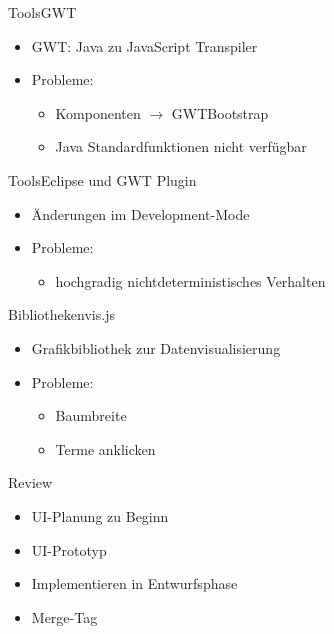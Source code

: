 \documentclass[10pt]{beamer}
\begin{document}
\begin{frame}{Tools}{GWT}
	\begin{itemize}
		\item GWT: Java zu JavaScript Transpiler 
		\item Probleme: 
		\begin{itemize}
			\item Komponenten $\rightarrow$ GWTBootstrap
			\item Java Standardfunktionen nicht verfügbar
		\end{itemize}
	\end{itemize}
\end{frame}

\begin{frame}{Tools}{Eclipse und GWT Plugin}
	\begin{itemize}
		\item Änderungen im Development-Mode  
		\item Probleme:
		\begin{itemize}
			\item hochgradig nichtdeterministisches Verhalten
		\end{itemize}
	\end{itemize}
\end{frame}


\begin{frame}{Bibliotheken}{vis.js}
	\begin{itemize}
		\item Grafikbibliothek zur Datenvisualisierung
		\item Probleme: 
			\begin{itemize}
				\item{Baumbreite}
				\item{Terme anklicken}
			\end{itemize}
	\end{itemize}
\end{frame}

\begin{frame}{Review}{}
	\begin{itemize}
		\item UI-Planung zu Beginn
		\item UI-Prototyp
		\item Implementieren in Entwurfsphase
		\item Merge-Tag
	\end{itemize}
	
\end{frame}

{\1
\begin{frame}
\end{frame}}
\end{document}
